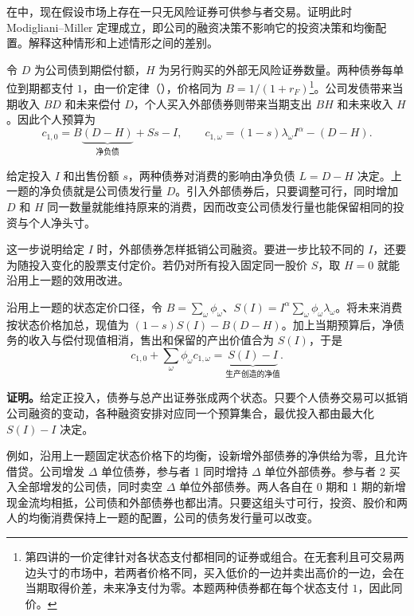 \par\noindent\begin{minipage}{\linewidth}
\begin{problem}
 在中，现在假设市场上存在一只无风险证券可供参与者交易。证明此时Modigliani--Miller 定理成立，即公司的融资决策不影响它的投资决策和均衡配置。解释这种情形和上述情形之间的差别。
\end{problem}
\end{minipage}\par
{}
\begin{solution}[blank-type=manual,blank-vsep=9\baselineskip]

令 $D$ 为公司债到期偿付额，$H$ 为另行购买的外部无风险证券数量。两种债券每单位到期都支付 $1$，由一价定律\ifdefined\WJHandoutKnowledge（）\fi，价格同为 $B=1/(1+r_F)$\footnote{第四讲的一价定律针对各状态支付都相同的证券或组合。在无套利且可交易两边头寸的市场中，若两者价格不同，买入低价的一边并卖出高价的一边，会在当期取得价差，未来净支付为零。本题两种债券都在每个状态支付 $1$，因此同价。}。公司发债带来当期收入 $BD$ 和未来偿付 $D$，个人买入外部债券则带来当期支出 $BH$ 和未来收入 $H$。因此个人预算为
\[
 c_{1,0}=B\underbrace{(D-H)}_{\text{净负债}}+Ss-I,\qquad
 c_{1,\omega}=(1-s)\lambda_\omega I^\alpha-(D-H).
\]

给定投入 $I$ 和出售份额 $s$，两种债券对消费的影响由净负债 $L=D-H$ 决定。上一题的净负债就是公司债发行量 $D$。引入外部债券后，只要调整可行，同时增加 $D$ 和 $H$ 同一数量就能维持原来的消费，因而改变公司债发行量也能保留相同的投资与个人净头寸。

这一步说明给定 $I$ 时，外部债券怎样抵销公司融资。要进一步比较不同的 $I$，还要为随投入变化的股票支付定价。若仍对所有投入固定同一股价 $S$，取 $H=0$ 就能沿用上一题的效用改进。

沿用上一题的状态定价口径，令 $B=\sum_\omega\phi_\omega$、$S(I)=I^\alpha\sum_\omega\phi_\omega\lambda_\omega$。将未来消费按状态价格加总，现值为 $(1-s)S(I)-B(D-H)$。加上当期预算后，净债务的收入与偿付现值相消，售出和保留的产出价值合为 $S(I)$，于是
\[
 c_{1,0}+\sum_\omega\phi_\omega c_{1,\omega}
 =\underbrace{S(I)-I}_{\text{生产创造的净值}}.
\]

\textbf{证明。}给定正投入，债券与总产出证券张成两个状态。只要个人债券交易可以抵销公司融资的变动，各种融资安排对应同一个预算集合，最优投入都由最大化 $S(I)-I$ 决定。

例如，沿用上一题固定状态价格下的均衡，设新增外部债券的净供给为零，且允许借贷。公司增发 $\Delta$ 单位债券，参与者 1 同时增持 $\Delta$ 单位外部债券。参与者 2 买入全部增发的公司债，同时卖空 $\Delta$ 单位外部债券。两人各自在 0 期和 1 期的新增现金流均相抵，公司债和外部债券也都出清。只要这组头寸可行，投资、股价和两人的均衡消费保持上一题的配置，公司的债务发行量可以改变。\qedhere
\end{solution}

